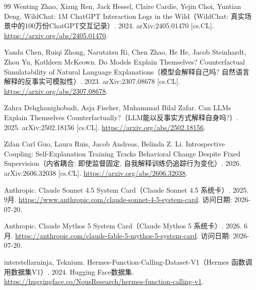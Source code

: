 \begin{thebibliography}{99}
 Wenting Zhao, Xiang Ren, Jack Hessel, Claire Cardie, Yejin Choi, Yuntian Deng. WildChat: 1M ChatGPT Interaction Logs in the Wild（WildChat: 真实场景中的100万份ChatGPT交互记录）. 2024. arXiv:2405.01470 [cs.CL]. \url{https://arxiv.org/abs/2405.01470}.

 Yanda Chen, Ruiqi Zhong, Narutatsu Ri, Chen Zhao, He He, Jacob Steinhardt, Zhou Yu, Kathleen McKeown. Do Models Explain Themselves? Counterfactual Simulatability of Natural Language Explanations（模型会解释自己吗? 自然语言解释的反事实可模拟性）. 2023. arXiv:2307.08678 [cs.CL]. \url{https://arxiv.org/abs/2307.08678}.

 Zahra Dehghanighobadi, Asja Fischer, Muhammad Bilal Zafar. Can LLMs Explain Themselves Counterfactually?（LLM能以反事实方式解释自身吗?）. 2025. arXiv:2502.18156 [cs.CL]. \url{https://arxiv.org/abs/2502.18156}.

 Zifan Carl Guo, Laura Ruis, Jacob Andreas, Belinda Z. Li. Introspective Coupling: Self-Explanation Training Tracks Behavioral Change Despite Fixed Supervision（内省耦合: 即使监督固定, 自我解释训练仍追踪行为变化）. 2026. arXiv:2606.32038 [cs.CL]. \url{https://arxiv.org/abs/2606.32038}.

 {Anthropic}. Claude Sonnet 4.5 System Card（Claude Sonnet 4.5 系统卡）. 2025. 9月. \url{https://www.anthropic.com/claude-sonnet-4-5-system-card}. 访问日期: 2026-07-20. 

 {Anthropic}. Claude Mythos 5 System Card（Claude Mythos 5 系统卡）. 2026. 6月. \url{https://anthropic.com/claude-fable-5-mythos-5-system-card}. 访问日期: 2026-07-20. 

 {interstellarninja}, {Teknium}. Hermes-Function-Calling-Dataset-V1（Hermes 函数调用数据集V1）. 2024. Hugging Face数据集. \url{https://huggingface.co/NousResearch/hermes-function-calling-v1}.

\end{thebibliography}
